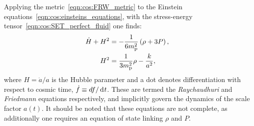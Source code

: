 Applying the metric~\eqref{eqn:cos:FRW_metric} to the Einstein equations~\eqref{eqn:cos:einsteins_equations}, with the stress-energy tensor~\eqref{eqn:cos:SET_perfect_fluid} one finds:
\begin{align}
  \dot{H}+H^2 &= 
  -\frac{1}{6m_{\mathrm{p}}^2}\left( \rho + 3P\right), 
  \label{eqn:cos:Raychaudhuri}
  \\
  H^2 &= 
  \frac{1}{3m_{\mathrm{p}}^2}\rho - \frac{k}{a^2}, 
  \label{eqn:cos:Friedmann}
\end{align}
%
where $H=\dot{a}/a$ is the Hubble parameter and a dot denotes differentiation with respect to cosmic time, $\dot{f}\equiv df/\operatorname{d}^{}\!{t}$. These are termed the {\em Raychaudhuri\/} and {\em Friedmann\/} equations respectively, and implicitly govern the dynamics of the scale factor $a(t)$. It should be noted that these equations are not complete, as additionally one requires an equation of state linking $\rho$ and $P$.

